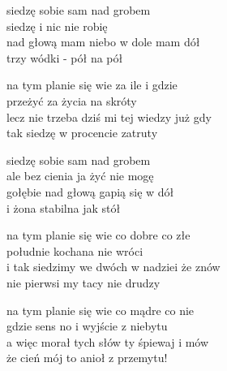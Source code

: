 \begin{text}
    siedzę sobie sam nad grobem\\
    siedzę i nic nie robię\\
    nad głową mam niebo w dole mam dół\\
    trzy wódki - pół na pół

    na tym planie się wie za ile i gdzie\\
    przeżyć za życia na skróty\\
    lecz nie trzeba dziś mi tej wiedzy już gdy\\
    tak siedzę w procencie zatruty

    siedzę sobie sam nad grobem\\
    ale bez cienia ja żyć nie mogę\\
    gołębie nad głową gapią się w dół\\
    i żona stabilna jak stół

    na tym planie się wie co dobre co złe\\
    południe kochana nie wróci\\
    i tak siedzimy we dwóch w nadziei że znów\\
    nie pierwsi my tacy nie drudzy

    na tym planie się wie co mądre co nie\\
    gdzie sens no i wyjście z niebytu\\
    a więc morał tych słów ty śpiewaj i mów\\
    że cień mój to anioł z przemytu!
\end{text}
\begin{chord}

\end{chord}